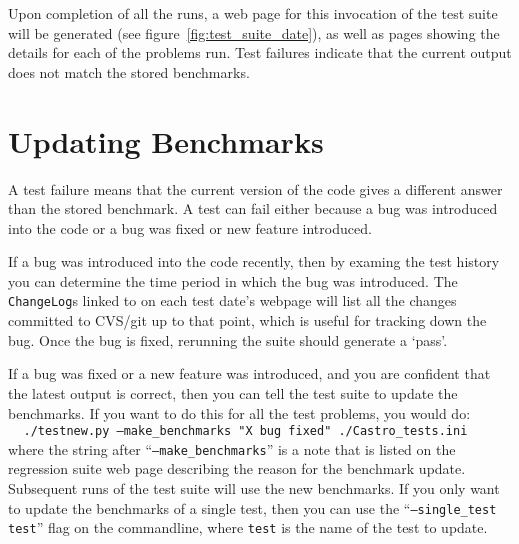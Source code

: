Upon completion of all the runs, a web page for this invocation of the
test suite will be generated (see figure~\ref{fig:test_suite_date}),
as well as pages showing the details for each of the problems run.
Test failures indicate that the current output does not match the stored
benchmarks.


\section{Updating Benchmarks}

A test failure means that the current version of the code gives a
different answer than the stored benchmark.  A test can fail either
because a bug was introduced into the code or a bug was fixed or new
feature introduced.

If a bug was introduced into the code recently, then by examing the
test history you can determine the time period in which the bug was
introduced.  The {\tt ChangeLog}s linked to on each test date's webpage
will list all the changes committed to CVS/git up to that point, which is
useful for tracking down the bug.  Once the bug is fixed, rerunning
the suite should generate a `pass'.

If a bug was fixed or a new feature was introduced, and you are
confident that the latest output is correct, then you can tell the
test suite to update the benchmarks.  If you want to do this for all
the test problems, you would do:\\
$~~~~~${\tt ./testnew.py --make\_benchmarks "X bug fixed" ./Castro\_tests.ini} \\
where the string after ``{\tt --make\_benchmarks}'' is a note that is listed
on the regression suite web page describing the reason for the benchmark
update.  Subsequent runs of the test suite will use the new benchmarks.
If you only want to update the benchmarks of a single test, then you
can use the ``{\tt --single\_test test}'' flag on the commandline, where
{\tt test} is the name of the test to update.

